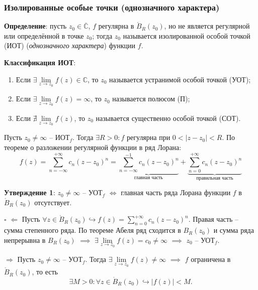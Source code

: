 \documentclass[12pt, a4paper, reqno]{article}
\begin{document}
    \subsubsection{Изолированные особые точки (однозначного характера)}

    \textbf{Определение}: пусть $z_0 \in \overline{\mathbb{C}}$, $f$ регулярна в $\mathring B_R(z_0)$,
    но не является регулярной или определённой в точке $z_0$; тогда $z_0$ называется изолированной
    особой точкой (ИОТ) (\textit{однозначного характера}) функции $f$.

    \textbf{Классификация ИОТ}:
    \begin{enumerate}
        \item Если $\exists \lim\limits_{z \to z_0} f(z) \in \mathbb{C}$, то $z_0$ называется
              устранимой особой точкой (УОТ);
        \item Если $\exists \lim\limits_{z \to z_0} f(z) = \infty$, то $z_0$ называется
              полюсом (П);
        \item Если $\nexists \lim\limits_{z \to z_0} f(z)$, то $z_0$ называется существенно
              особой точкой (СОТ).
    \end{enumerate}

    Пусть $z_0 \neq \infty$ -- ИОТ$_f$. Тогда $\exists R > 0: f$ регулярна при $0 < |z - z_0| < R$.
    По теореме о разложении регулярной функции в ряд Лорана:
    \begin{equation*}
        f(z) = \sum\limits_{n = -\infty}^{+\infty} c_n (z - z_0)^n =
        \underbrace{\sum\limits_{n = -\infty}^{-1} c_n (z - z_0)^n}_\text{главная часть} +
        \underbrace{\sum\limits_{n = 0}^{+\infty} c_n (z - z_0)^n}_\text{правильная часть}
    \end{equation*}

    \textbf{Утверждение 1}: $z_0 \neq \infty$ -- УОТ$_f$ $\iff$ главная часть ряда Лорана функции
    $f$ в $\mathring B_R(z_0)$ отсутствует.

    $\square$ $\boxed{\Leftarrow}$ Пусть $\forall z \in \mathring B_R(z_0) \hookrightarrow
    f(z) = \sum\limits_{n = 0}^{+\infty} c_n(z - z_0)^n$. Правая часть -- сумма степенного ряда. По
    теореме Абеля ряд сходится в $B_R(z_0)$ и сумма ряда непрерывна в $B_R(z_0)$ $\implies$
    $\exists \lim\limits_{z \to z_0} f(z) = c_0 \neq \infty$ $\implies$ $z_0$ -- УОТ$_f$.

    $\boxed{\Rightarrow}$ Пусть $z_0 \neq \infty$ -- УОТ$_f$. Тогда
    $\exists \lim\limits_{z \to z_0} f(z) \neq \infty$ $\implies$ $f$ ограничена в $\mathring B_R(z_0)$,
    то есть
    \begin{equation*}
        \exists M > 0: \forall z \in \mathring B_R(z_0) \hookrightarrow |f(z)| < M.
    \end{equation*}
\end{document}
